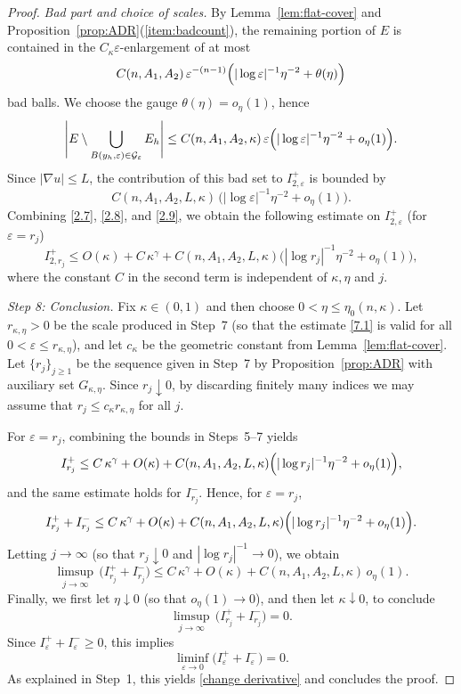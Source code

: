 \documentclass[10pt,a4paper]{amsart}
\begin{document}
\begin{proof}
\smallskip
\noindent\emph{Bad part and choice of scales.}
{By Lemma~\ref{lem:flat-cover} and Proposition~\ref{prop:ADR}(\ref{item:badcount}), the remaining portion of $E$ is contained in
the $C_\kappa\varepsilon$-enlargement of at most}
\[
{
C(n,A_1,A_2)\,\varepsilon^{-(n-1)}\Bigl(|\log\varepsilon|^{-1}\eta^{-2}+\theta(\eta)\Bigr)
}
\]
{bad balls. We choose the gauge $\theta(\eta)=o_\eta(1)$, hence}
\begin{equation}\label{2.9}
{
\Bigg|E\setminus\bigcup_{B(y_h,\varepsilon)\in\mathcal G_\varepsilon}E_h\Bigg|
\le C(n,A_1,A_2,\kappa)\,\varepsilon
\Bigl(|\log\varepsilon|^{-1}\eta^{-2}+o_\eta(1)\Bigr).
}
\end{equation}
{Since $|\nabla u|\le L$, the contribution of this bad set to $I^+_{2,\varepsilon}$ is bounded by}
$$
{
C(n,A_1,A_2,L,\kappa)\,\bigl(|\log\varepsilon|^{-1}\eta^{-2}+o_\eta(1)\bigr).
}
$$
{Combining \eqref{2.7}, \eqref{2.8}, and \eqref{2.9}, we obtain the following estimate on $I^+_{2,\varepsilon}$
(for $\varepsilon=r_j$)}
$$
{I_{2, r_j}^+\le O(\kappa) +  C\,\kappa^\gamma
 + C(n,A_1,A_2,L,\kappa)\bigl(|\log r_j|^{-1}\eta^{-2}+o_\eta(1)\bigr),}
$$
{where the constant $C$ in the second term is independent of $\kappa,\eta$ and $j$.}


\medskip
\noindent\textit{Step 8: Conclusion.}
Fix $\kappa\in(0,1)$ and {then choose $0<\eta\le\eta_0(n,\kappa)$}. Let $r_{\kappa,\eta}>0$ be the scale produced in
Step~7 (so that the estimate \eqref{7.1} is valid for all
$0<\varepsilon\le r_{\kappa,\eta}$), {and let $c_\kappa$ be the geometric constant from Lemma~\ref{lem:flat-cover}}.
Let $\{r_j\}_{j\ge 1}$ be the sequence given in Step~7 by Proposition~\ref{prop:ADR} {with auxiliary set $G_{\kappa,\eta}$}.
Since $r_j\downarrow 0$, by discarding finitely many indices we may assume that
{$r_j\le c_\kappa r_{\kappa,\eta}$} for all $j$.

For $\varepsilon=r_j$, combining the bounds in Steps~5--7 yields
\[
I^+_{r_j}\le C\,\kappa^\gamma + O(\kappa)
+ {C(n,A_1,A_2,L,\kappa)}\Bigl(|\log r_j|^{-1}\eta^{-2}+o_\eta(1)\Bigr),
\]
and the same estimate holds for $I^-_{r_j}$. Hence, for $\varepsilon=r_j$,
\[
I^+_{r_j}+I^-_{r_j}\le C\,\kappa^\gamma + O(\kappa)
+ {C(n,A_1,A_2,L,\kappa)}\Bigl(|\log r_j|^{-1}\eta^{-2}+o_\eta(1)\Bigr).
\]
Letting $j\to\infty$ (so that $r_j\downarrow 0$ and $|\log r_j|^{-1}\to 0$), we obtain
\[
\limsup_{j\to\infty}\,\bigl(I^+_{r_j}+I^-_{r_j}\bigr)
\le C\,\kappa^\gamma + O(\kappa) + {C(n,A_1,A_2,L,\kappa)}\,o_\eta(1).
\]
Finally, we first let $\eta\downarrow 0$ (so that $o_\eta(1)\to 0$), and then let
$\kappa\downarrow 0$, to conclude
\[
\limsup_{j\to\infty}\, \bigl(I^+_{r_j}+I^-_{r_j}\bigr)=0.
\]
Since $I^+_\varepsilon+I^-_\varepsilon\ge 0$, this implies
\[
\liminf_{\varepsilon\to 0}\bigl(I^+_\varepsilon+I^-_\varepsilon\bigr)=0.
\]
As explained in Step~1, this yields \eqref{change derivative} and concludes the proof.
\end{proof}
\end{document}

